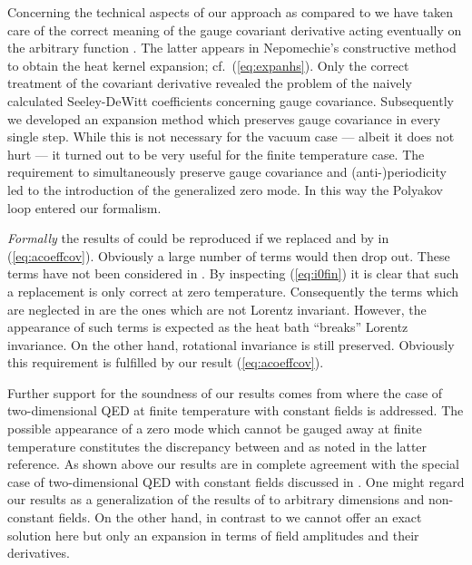 \documentclass[a4paper,showpacs,showkeys,prd,nofootinbib]{revtex4}
\begin{document}
Concerning the technical aspects of our approach as compared to 
\cite{Boschi-Filho:1992ah} we have taken care of the correct meaning of the
gauge covariant derivative acting eventually on the arbitrary function \coordHE{}.
The latter appears in Nepomechie's constructive method to obtain the heat kernel 
expansion; cf.~(\ref{eq:expanhs}). Only the correct treatment of the covariant
derivative revealed the problem of the naively calculated Seeley-DeWitt coefficients
concerning gauge covariance. Subsequently we developed an expansion method 
which preserves gauge covariance in every single step. While this is not necessary
for the vacuum case --- albeit it does not hurt --- it turned out to be very useful
for the finite temperature case. The requirement to 
simultaneously preserve gauge covariance and (anti-)periodicity led to the introduction
of the generalized zero mode. In this way the Polyakov loop entered our formalism.

{\em Formally} the results of \cite{Boschi-Filho:1992ah} could be reproduced if we replaced 
\coordHE{} and \coordHE{} by \coordHE{} in (\ref{eq:acoeffcov}). Obviously a large number of 
terms would then drop out. 
These terms have not been considered in \cite{Boschi-Filho:1992ah}. By inspecting 
(\ref{eq:i0fin}) it is clear that such a replacement is only correct at zero 
temperature. Consequently the terms which are neglected in \cite{Boschi-Filho:1992ah} are the
ones which are not Lorentz invariant. However, the appearance of such terms is
expected as the heat bath ``breaks'' Lorentz invariance. On the other hand, rotational
invariance is still preserved. Obviously this requirement is fulfilled by our result
(\ref{eq:acoeffcov}). 

Further support for the soundness of our results comes from \cite{Actor:1998cn} where
the case of two-dimensional QED at finite temperature with constant fields is 
addressed. The possible appearance of a zero mode which cannot be gauged away at finite
temperature constitutes the discrepancy between
\cite{Boschi-Filho:1992ah} and \cite{Actor:1998cn} as noted in the latter reference.
As shown above our results are
in complete agreement with the special case of two-dimensional QED with constant fields
discussed in \cite{Actor:1998cn}. One might regard
our results as a generalization of the results of \cite{Actor:1998cn} to arbitrary 
dimensions and non-constant fields. On the other hand, in
contrast to \cite{Actor:1998cn} we cannot offer an exact solution here but only an expansion
in terms of field amplitudes and their derivatives. 
\end{document}
